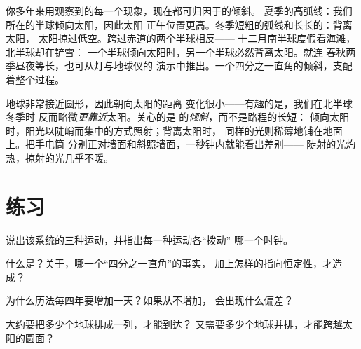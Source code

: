 \begin{example}[旧线索的解释]\label{ex:g6:sun-earth-moon:clues}
你多年来用观察到的每一个现象，现在都可归因于的倾斜。
夏季的高弧线：我们所在的半球倾向太阳，因此太阳
正午位置更高。冬季短粗的弧线和长长的：背离太阳，
太阳掠过低空。跨过赤道的两个半球相反——
十二月南半球度假看海滩，北半球却在铲雪：
一个半球倾向太阳时，另一个半球必然背离太阳。就连
春秋两季昼夜等长，也可从灯与地球仪的
演示中推出。一个四分之一直角的倾斜，支配着整个过程。
\end{example}

\begin{remark}\label{rem:g6:sun-earth-moon:notdistance}
地球非常接近圆形，因此朝向太阳的距离
变化很小——有趣的是，我们在北半球冬季时
反而略微\emph{更靠近}太阳。关心的是
的\emph{倾斜}，而不是路程的长短：
倾向太阳时，阳光以陡峭而集中的方式照射；背离太阳时，
同样的光则稀薄地铺在地面上。把手电筒
分别正对墙面和斜照墙面，一秒钟内就能看出差别——
陡射的光灼热，掠射的光几乎不暖。
\end{remark}

\section{练习}

\begin{exercise}[$\star$]\label{exo:g6:sun-earth-moon:1}
说出该系统的三种运动，并指出每一种运动各“拨动”
哪一个时钟。
\end{exercise}

\begin{exercise}[$\star$]\label{exo:g6:sun-earth-moon:2}
什么是？关于，哪一个“四分之一直角”的事实，
加上怎样的指向恒定性，才造成？
\end{exercise}

\begin{exercise}[$\star$]\label{exo:g6:sun-earth-moon:3}
为什么历法每四年要增加一天？如果从不增加，
会出现什么偏差？
\end{exercise}

\begin{exercise}[$\star$]\label{exo:g6:sun-earth-moon:4}
大约要把多少个地球排成一列，才能到达？
又需要多少个地球并排，才能跨越太阳的圆面？
\end{exercise}

